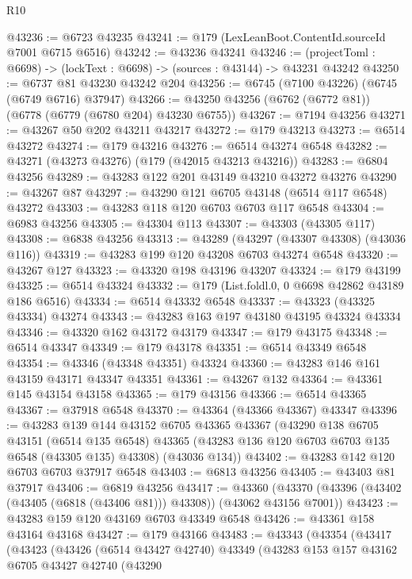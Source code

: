 \begin{lexlean}{R10}
\begin{coremodule}
@43236 := @6723 @43235
@43241 := @179 (LexLeanBoot.ContentId.sourceId @7001 @6715 @6516)
@43242 := @43236 @43241
@43246 := (projectToml : @6698) -> (lockText : @6698) -> (sources : @43144) -> @43231 @43242
@43250 := @6737 @81 @43230 @43242 @204
@43256 := @6745 (@7100 @43226) (@6745 (@6749 @6716) @37947)
@43266 := @43250 @43256 (@6762 (@6772 @81)) (@6778 (@6779 (@6780 @204) @43230 @6755))
@43267 := @7194 @43256
@43271 := @43267 @50 @202 @43211 @43217
@43272 := @179 @43213
@43273 := @6514 @43272
@43274 := @179 @43216
@43276 := @6514 @43274 @6548
@43282 := @43271 (@43273 @43276) (@179 (@42015 @43213 @43216))
@43283 := @6804 @43256
@43289 := @43283 @122 @201 @43149 @43210 @43272 @43276
@43290 := @43267 @87
@43297 := @43290 @121 @6705 @43148 (@6514 @117 @6548) @43272
@43303 := @43283 @118 @120 @6703 @6703 @117 @6548
@43304 := @6983 @43256
@43305 := @43304 @113
@43307 := @43303 (@43305 @117)
@43308 := @6838 @43256
@43313 := @43289 (@43297 (@43307 @43308) (@43036 @116))
@43319 := @43283 @199 @120 @43208 @6703 @43274 @6548
@43320 := @43267 @127
@43323 := @43320 @198 @43196 @43207
@43324 := @179 @43199
@43325 := @6514 @43324
@43332 := @179 (List.foldl.{0, 0} @6698 @42862 @43189 @186 @6516)
@43334 := @6514 @43332 @6548
@43337 := @43323 (@43325 @43334) @43274
@43343 := @43283 @163 @197 @43180 @43195 @43324 @43334
@43346 := @43320 @162 @43172 @43179
@43347 := @179 @43175
@43348 := @6514 @43347
@43349 := @179 @43178
@43351 := @6514 @43349 @6548
@43354 := @43346 (@43348 @43351) @43324
@43360 := @43283 @146 @161 @43159 @43171 @43347 @43351
@43361 := @43267 @132
@43364 := @43361 @145 @43154 @43158
@43365 := @179 @43156
@43366 := @6514 @43365
@43367 := @37918 @6548
@43370 := @43364 (@43366 @43367) @43347
@43396 := @43283
    @139
    @144
    @43152
    @6705
    @43365
    @43367
    (@43290
      @138
      @6705
      @43151
      (@6514 @135 @6548)
      @43365
      (@43283 @136 @120 @6703 @6703 @135 @6548 (@43305 @135) @43308)
      (@43036 @134))
@43402 := @43283 @142 @120 @6703 @6703 @37917 @6548
@43403 := @6813 @43256
@43405 := @43403 @81 @37917
@43406 := @6819 @43256
@43417 := @43360
    (@43370 (@43396 (@43402 (@43405 (@6818 (@43406 @81))) @43308)) (@43062 @43156 @7001))
@43423 := @43283 @159 @120 @43169 @6703 @43349 @6548
@43426 := @43361 @158 @43164 @43168
@43427 := @179 @43166
@43483 := @43343
    (@43354
      (@43417
        (@43423
          (@43426
            (@6514 @43427 @42740)
            @43349
            (@43283
              @153
              @157
              @43162
              @6705
              @43427
              @42740
              (@43290

\end{coremodule}
\end{lexlean}
